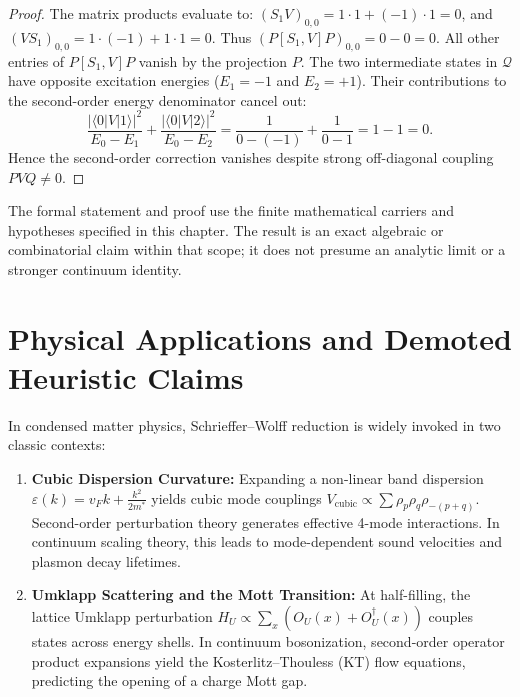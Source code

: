 \begin{proof}
The matrix products evaluate to:
$(S_1 V)_{0, 0} = 1 \cdot 1 + (-1) \cdot 1 = 0$, and $(V S_1)_{0, 0} = 1 \cdot (-1) + 1 \cdot 1 = 0$.
Thus $(P [S_1, V] P)_{0, 0} = 0 - 0 = 0$. All other entries of $P [S_1, V] P$ vanish by the projection $P$.
The two intermediate states in $\mathcal{Q}$ have opposite excitation energies ($E_1 = -1$ and $E_2 = +1$). Their contributions to the second-order energy denominator cancel out:
\[
\frac{|\langle 0 | V | 1 \rangle|^2}{E_0 - E_1} + \frac{|\langle 0 | V | 2 \rangle|^2}{E_0 - E_2} = \frac{1}{0 - (-1)} + \frac{1}{0 - 1} = 1 - 1 = 0.
\]
Hence the second-order correction vanishes despite strong off-diagonal coupling $P V Q \neq 0$.
\end{proof}

\begin{remark}
The formal statement and proof use the finite mathematical carriers and hypotheses specified in this chapter. The result is an exact algebraic or combinatorial claim within that scope; it does not presume an analytic limit or a stronger continuum identity.
\end{remark}

\section{Physical Applications and Demoted Heuristic Claims}

In condensed matter physics, Schrieffer--Wolff reduction is widely invoked in two classic contexts:
\begin{enumerate}
    \item \textbf{Cubic Dispersion Curvature:} Expanding a non-linear band dispersion $\varepsilon(k) = v_F k + \frac{k^2}{2m^*}$ yields cubic mode couplings $V_{\mathrm{cubic}} \propto \sum \rho_p \rho_q \rho_{-(p+q)}$. Second-order perturbation theory generates effective 4-mode interactions. In continuum scaling theory, this leads to mode-dependent sound velocities and plasmon decay lifetimes.
    \item \textbf{Umklapp Scattering and the Mott Transition:} At half-filling, the lattice Umklapp perturbation $H_U \propto \sum_x (O_U(x) + O_U^\dagger(x))$ couples states across energy shells. In continuum bosonization, second-order operator product expansions yield the Kosterlitz--Thouless (KT) flow equations, predicting the opening of a charge Mott gap.
\end{enumerate}

